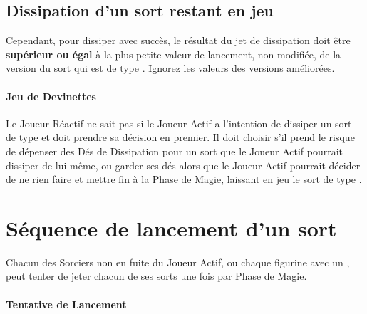 \subsection{Dissipation d'un sort restant en jeu}
\label{dispel_remains_in_play_spells}

 Cependant, pour dissiper avec succès, le résultat du jet de dissipation doit être \textbf{supérieur ou égal} à la plus petite valeur de lancement, non modifiée, de la version du sort qui est de type \remainsinplay{}. Ignorez les valeurs des versions améliorées.

\paragraph{Jeu de Devinettes}

Le Joueur Réactif ne sait pas si le Joueur Actif a l'intention de dissiper un sort de type \remainsinplay{} et doit prendre sa décision en premier. Il doit choisir s'il prend le risque de dépenser des Dés de Dissipation pour un sort que le Joueur Actif pourrait dissiper de lui-même, ou garder ses dés alors que le Joueur Actif pourrait décider de ne rien faire et mettre fin à la Phase de Magie, laissant en jeu le sort de type \remainsinplay{}.

\newpage
\section{Séquence de lancement d'un sort}
\label{spell_casting_sequence}

Chacun des Sorciers non en fuite du Joueur Actif, ou chaque figurine avec un \boundspell{}, peut tenter de jeter chacun de ses sorts une fois par Phase de Magie.

\paragraph{Tentative de Lancement}


